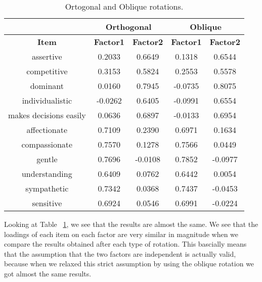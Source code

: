 \documentclass[a4paper,12pt,oneside]{book}
\begin{document}
\begin{table}[h!t]
	\caption{Ortogonal and Oblique rotations.} \label{table:rotationsboth}
	\centering
	\begin{tabular}{c |c c |c c|}
	\hline
	{} & \multicolumn{2}{|c|}{Orthogonal} & \multicolumn{2}{|c|}{Oblique} \\
	\hline
	\bf Item & \bf Factor1 & \bf Factor2 & \bf \bf Factor1 & \bf Factor2 \\
	assertive & 0.2033 & 0.6649 & 0.1318 & 0.6544 \\
	competitive & 0.3153 &  0.5824 & 0.2553 & 0.5578 \\
	dominant & 0.0160 &  0.7945 & -0.0735 & 0.8075 \\
	individualistic & -0.0262 & 0.6405 & -0.0991 & 0.6554  \\
	makes decisions easily & 0.0636 & 0.6897 & -0.0133 & 0.6954 \\
	affectionate & 0.7109 & 0.2390 & 0.6971 & 0.1634 \\
	compassionate & 0.7570 & 0.1278 & 0.7566 & 0.0449 \\
	gentle & 0.7696 & -0.0108 & 0.7852 & -0.0977 \\
	understanding &  0.6409 & 0.0762 & 0.6442 & 0.0054 \\
	sympathetic & 0.7342 & 0.0368 & 0.7437 & -0.0453 \\
	sensitive & 0.6924 & 0.0546 & 0.6991 & -0.0224 \\
	\hline
	\end{tabular}
\end{table}    

Looking at Table ~\ref{table:rotationsboth}, we see that the results are almost the same. We see that the loadings of each item on each factor
are very similar in magnitude when we compare the results obtained after each type of rotation. This bascially means that the assumption that the
two factors are independent is actually valid, because when we relaxed this strict assumption by using the oblique rotation we got almost the same
results.   
\end{document}

